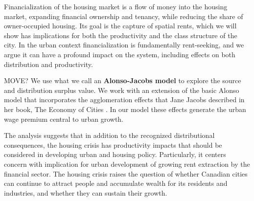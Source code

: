 

Financialization of the housing market is a flow of money into the housing market, expanding financial ownership and tenancy, while reducing the share of owner-occupied housing. Its goal is the capture of spatial rents, which we will show has implications for both the productivity and the class structure of the city. 
In the urban context financialization is fundamentally \gls{rent-seeking}, and we argue it can have a profound impact on the system, including effects on both distribution and productivity. 



MOVE? We use what we call an \textbf{\gls{Alonso-Jacobs model}} to explore the source and distribution surplus value. We  work with an extension of the basic Alonso model that incorporates the \glspl{agglomeration effect} that Jane Jacobs  described in her book, The Economy of Cities \cite{jacobsEconomyCities1969}. In our model these effects generate the \gls{urban wage premium} central to urban growth. %

The analysis suggests that in addition to the recognized distributional consequences, the housing crisis has productivity impacts that should be considered in developing urban and housing policy. Particularly, it centers concern with implication for urban development of growing rent extraction by the financial sector. 
The housing crisis raises the question of whether Canadian cities can continue to attract people and accumulate wealth for its residents and industries, and whether they can sustain their growth.



